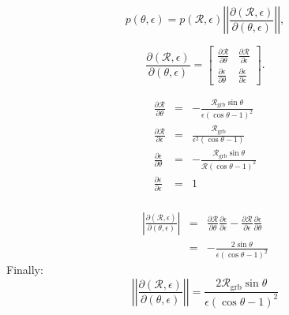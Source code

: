 \documentclass[nofootinbib]{revtex4}
\newcommand{\grbrate}{{{\mathcal R}_{\mathrm{grb}}}}
\newcommand{\cbcrate}{{{\mathcal R}}}
\begin{document}
\begin{equation}
p(\theta,\epsilon) = p(\cbcrate,\epsilon)
\left\lvert\left\lvert
\frac{\partial(\cbcrate,\epsilon)}{\partial(\theta,\epsilon)}
\right\rvert\right\rvert,
\end{equation}

\begingroup
\renewcommand*{\arraystretch}{1.5}

\begin{equation}
\frac{\partial (\cbcrate,\epsilon)}{\partial(\theta,\epsilon)} =
\begin{bmatrix}
\frac{\partial \cbcrate}{\partial \theta} & \frac{\partial \cbcrate}{\partial \epsilon} \\
\frac{\partial \epsilon}{\partial \theta} & \frac{\partial \epsilon}{\partial \epsilon}
\end{bmatrix}.
\end{equation}

\endgroup

\begin{eqnarray}
\frac{\partial \cbcrate}{\partial \theta} & = &
-\frac{\grbrate\sin\theta}{\epsilon(\cos\theta - 1)^2}\\
\frac{\partial \cbcrate}{\partial \epsilon} & = &
\frac{\grbrate}{\epsilon^2(\cos\theta-1)}\\
\frac{\partial \epsilon}{\partial \theta} & = &
-\frac{\grbrate\sin\theta}{\cbcrate(\cos\theta-1)^2}\\
\frac{\partial \epsilon}{\partial \epsilon} & = & 1\\
\end{eqnarray}

\begin{eqnarray}
\left\lvert
\frac{\partial(\cbcrate,\epsilon)}{\partial(\theta,\epsilon)}
\right\rvert & = & \frac{\partial \cbcrate}{\partial \theta}
\frac{\partial \epsilon}{\partial \epsilon} - \frac{\partial \cbcrate}{\partial
\epsilon}\frac{\partial \epsilon}{\partial \theta} \\
& = & -\frac{2\sin\theta}{\epsilon(\cos\theta-1)^2}
\end{eqnarray}
%
Finally:
\begin{equation}
\left\lvert\left\lvert
\frac{\partial(\cbcrate,\epsilon)}{\partial(\theta,\epsilon)}
\right\rvert\right\rvert = \frac{2\grbrate\sin\theta}{\epsilon(\cos\theta-1)^2} 
\end{equation}
\end{document}
